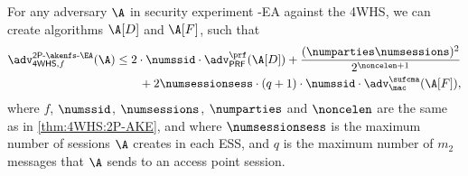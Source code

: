 \begin{theorem}\label{thm:4WHS:EA}
For any adversary $\A$ in security experiment \akenfstext-EA against the 4WHS,
we can create algorithms $\A[D]$ and $\A[F]$, such that
\begin{align}
	\begin{split}
	\adv_{\mathsf{4WHS},f}^{\operatorname{\mathsf{2P-\akenfs-\EA}}}(\A)  
		&\leq 2 \cdot \numssid \cdot  \adv_{\mathsf{PRF}}^{\prf}(\A[D]) 
			+ \frac{(\numparties  \numsessions)^2}{2^{\noncelen+1}} \\
		&\qquad + 2 \numsessionsess \cdot  (q + 1) \cdot \numssid \cdot  \adv^{\sufcma}_{\mac}(\A[F]) ,
	\end{split}
\end{align}
\normalsize
where $f$, $\numssid$, $\numsessions$, $\numparties$ and $\noncelen$ are the same as in \cref{thm:4WHS:2P-AKE},
and where  $\numsessionsess$ is the maximum number of sessions $\A$ creates in each ESS,
and $q$ is the maximum number of $m_2$ messages that $\A$ sends to an access point session.
\end{theorem}
\normalsize

